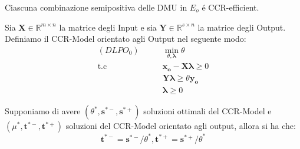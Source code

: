 \begin{teor} Ciascuna combinazione semipositiva delle DMU in $E_{o}$ \'e CCR-efficient.
\end{teor}
\begin{definiz}
Sia $\boldsymbol{X} \in \mathbb{R}^{m \times n}$ la matrice degli Input e sia $\boldsymbol{Y} \in \mathbb{R}^{s \times n}$  la matrice degli Output. Definiamo il CCR-Model orientato agli Output nel seguente modo:
\begin{equation} \label{eq1}
\begin{split}
(DLPO_0) \qquad & \min_{\theta, \boldsymbol{\lambda}} \theta \\
\text{t.c} \qquad & \boldsymbol{x_o} - \boldsymbol{X\lambda} \geq 0 \\
& \boldsymbol{Y\lambda} \geq \theta\boldsymbol{y_o} \\
& \boldsymbol{\lambda} \geq 0
\end{split}
\end{equation}
\end{definiz}
\begin{oss} Supponiamo di avere $(\theta^{*}, \boldsymbol{s^{*-}}, \boldsymbol{s^{*+}})$ soluzioni ottimali del CCR-Model e $(\mu^{*}, \boldsymbol{t^{*-}}, \boldsymbol{t^{*+}})$ soluzioni del CCR-Model orientato agli output, allora si ha che:
\begin{equation}
\boldsymbol{t^{*-}} = \boldsymbol{s^{*-}} / \theta^{*}, 
\boldsymbol{t^{*+}} = \boldsymbol{s^{*+}} / \theta^{*}
\end{equation}
\end{oss}
